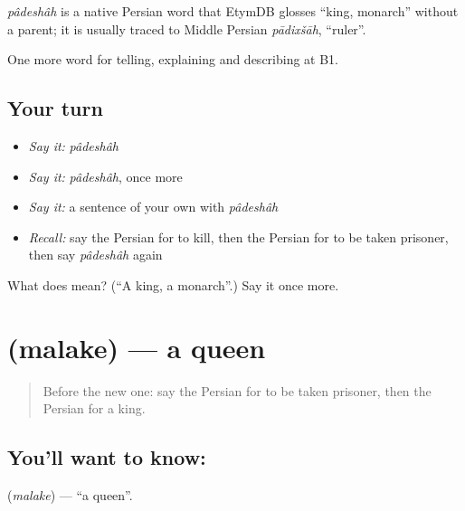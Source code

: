 \begin{cousinweb}
\emph{pâdeshâh} is a native Persian word that EtymDB glosses \textquotedblleft{}king, monarch\textquotedblright{} without a parent; it is usually traced to Middle Persian \emph{pādixšāh}, \textquotedblleft{}ruler\textquotedblright{}.
\end{cousinweb}

\begin{grammarlens}[title={What you've built}]
One more word for telling, explaining and describing at B1.
\end{grammarlens}

\subsection*{Your turn}
\begin{itemize}
\raggedright
  \item \emph{Say it:} \emph{pâdeshâh}
  \item \emph{Say it:} \emph{pâdeshâh}, once more
  \item \emph{Say it:} a sentence of your own with \emph{pâdeshâh}
  \item \emph{Recall:} say the Persian for to kill, then the Persian for to be taken prisoner, then say \emph{pâdeshâh} again
\end{itemize}

\begin{tcolorbox}[breakable,colback=teal!4,colframe=teal!35!black,title={Before you move on}]
What does  mean? (\textquotedblleft{}A king, a monarch\textquotedblright{}.) Say it once more.
\end{tcolorbox}
\section[\texorpdfstring{\fa{ملکه} (malake)}{ملکه (malake)}]{ (malake) — a queen}

\label{lesson:FA-C350-malake}



\begin{quote}
Before the new one: say the Persian for to be taken prisoner, then the Persian for a king.
\end{quote}

\subsection*{You'll want to know: }
\textbf{} (\emph{malake}) — \textquotedblleft{}a queen\textquotedblright{}.

